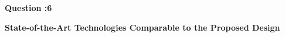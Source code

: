 \newcommand{\hawraacompactband}[1]{%
  \vspace{0.15em}%
  {\fontsize{9.7}{11.4}\selectfont\bfseries\color{HawraaBlue}#1}\par
  \vspace{0.16em}%
  {\color{AUBLine}\rule{\linewidth}{0.55pt}}\par
  \vspace{0.25em}%
}

\newcommand{\hawraacompactcomparison}[1]{%
  \begingroup
  \setlength{\fboxsep}{5pt}%
  \noindent\colorbox{HawraaMint}{%
    \parbox{\dimexpr\linewidth-2\fboxsep-2\fboxrule\relax}{%
      \raggedright\fontsize{6.9}{8.2}\selectfont #1}}\par
  \endgroup
}

\newcommand{\hawraacompactsource}[1]{%
  \begingroup
  \setlength{\fboxsep}{4.5pt}%
  \noindent\colorbox{HawraaIce}{%
    \parbox{\dimexpr\linewidth-2\fboxsep\relax}{%
      \raggedright\fontsize{5.7}{6.7}\selectfont\color{AUBGray}#1}}\par
  \endgroup
}

\newcommand{\hawraachallenge}[1]{%
  \begingroup
  \setlength{\fboxsep}{8pt}%
  \noindent\colorbox{HawraaSand}{%
    \parbox{\dimexpr\linewidth-2\fboxsep-2\fboxrule\relax}{%
      \fontsize{9.1}{11.15}\selectfont #1}}\par
  \endgroup
}

\clearpage
\pagestyle{hawraa}
\thispagestyle{hawraa}
\hypertarget{q6-hawraa}{}


\begingroup
\setlength{\fboxsep}{9pt}%
\noindent\colorbox{HawraaMint}{%
  \parbox{\dimexpr\linewidth-2\fboxsep\relax}{%
    {\fontsize{9}{11}\selectfont\bfseries\color{HawraaBlue}Question :6}\par
    \vspace{0.2em}
    {\fontsize{12}{14.5}\selectfont\bfseries\color{AUBBlack}
      State-of-the-Art Technologies Comparable to the Proposed Design}\par
  }}\par
\endgroup

